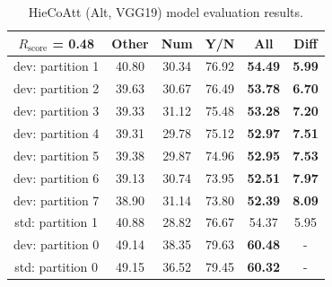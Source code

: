 \documentclass[letterpaper]{article}
\newcommand{\rscore}{}\def\rscore/{$R_{\text{score}}$}
\begin{document}
\begin{table}
\begin{subtable}{0.49\linewidth}
		\begin{adjustbox}{width=0.46\columnwidth}
\begin{tabular}{c | c c c c | c}
			\rscore/ = 0.48  & Other & Num   & Y/N   & All            & Diff          \\ [0.5ex]
			\hline
			dev: partition 1 & 40.80 & 30.34 & 76.92 & \textbf{54.49} & \textbf{5.99} \\
			dev: partition 2 & 39.63 & 30.67 & 76.49 & \textbf{53.78} & \textbf{6.70} \\
			dev: partition 3 & 39.33 & 31.12 & 75.48 & \textbf{53.28} & \textbf{7.20} \\
			dev: partition 4 & 39.31 & 29.78 & 75.12 & \textbf{52.97} & \textbf{7.51} \\
			dev: partition 5 & 39.38 & 29.87 & 74.96 & \textbf{52.95} & \textbf{7.53} \\
			dev: partition 6 & 39.13 & 30.74 & 73.95 & \textbf{52.51} & \textbf{7.97} \\
			dev: partition 7 & 38.90 & 31.14 & 73.80 & \textbf{52.39} & \textbf{8.09} \\
			\hline
			std: partition 1 & 40.88 & 28.82 & 76.67 & 54.37          & 5.95          \\
			\hline
			dev: partition 0 & 49.14 & 38.35 & 79.63 & \textbf{60.48} & -             \\
			std: partition 0 & 49.15 & 36.52 & 79.45 & \textbf{60.32} & -             \\
			\hline
		\end{tabular}
\end{adjustbox}
		\caption{HieCoAtt (Alt, VGG19) model evaluation results.}


\end{subtable}
\end{table}
\end{document}
